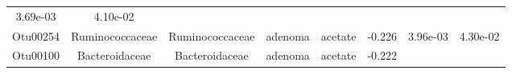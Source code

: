 \documentclass[11pt,]{article}
\begin{document}
\begin{longtable}[]{@{}cccccccc@{}}
\begin{minipage}[t]{0.08\columnwidth}
3.69e-03\strut
\end{minipage} & \begin{minipage}[t]{0.08\columnwidth}\centering\strut
4.10e-02\strut
\end{minipage}\tabularnewline
\begin{minipage}[t]{0.08\columnwidth}\centering\strut
Otu00254\strut
\end{minipage} & \begin{minipage}[t]{0.15\columnwidth}\centering\strut
Ruminococcaceae\strut
\end{minipage} & \begin{minipage}[t]{0.15\columnwidth}\centering\strut
Ruminococcaceae\strut
\end{minipage} & \begin{minipage}[t]{0.08\columnwidth}\centering\strut
adenoma\strut
\end{minipage} & \begin{minipage}[t]{0.09\columnwidth}\centering\strut
acetate\strut
\end{minipage} & \begin{minipage}[t]{0.07\columnwidth}\centering\strut
-0.226\strut
\end{minipage} & \begin{minipage}[t]{0.08\columnwidth}\centering\strut
3.96e-03\strut
\end{minipage} & \begin{minipage}[t]{0.08\columnwidth}\centering\strut
4.30e-02\strut
\end{minipage}\tabularnewline
\begin{minipage}[t]{0.08\columnwidth}\centering\strut
Otu00100\strut
\end{minipage} & \begin{minipage}[t]{0.15\columnwidth}\centering\strut
Bacteroidaceae\strut
\end{minipage} & \begin{minipage}[t]{0.15\columnwidth}\centering\strut
Bacteroidaceae\strut
\end{minipage} & \begin{minipage}[t]{0.08\columnwidth}\centering\strut
adenoma\strut
\end{minipage} & \begin{minipage}[t]{0.09\columnwidth}\centering\strut
acetate\strut
\end{minipage} & \begin{minipage}[t]{0.07\columnwidth}\centering\strut
-0.222\strut
\end{minipage} & \begin{minipage}[t]{0.08\columnwidth}\centering\strut

\end{minipage}
\end{longtable}
\end{document}
